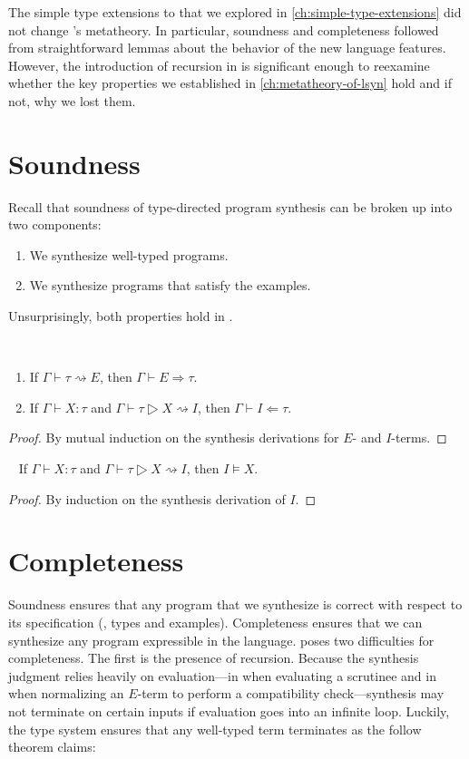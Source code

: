 The simple type extensions to \lsyn{} that we explored in \autoref{ch:simple-type-extensions} did not change \lsyn{}'s metatheory.
In particular, soundness and completeness followed from straightforward lemmas about the behavior of the new language features.
However, the introduction of recursion in \mlsyn{} is significant enough to reexamine whether the key properties we established in \autoref{ch:metatheory-of-lsyn} hold and if not, why we lost them.

\section{Soundness}

Recall that soundness of type-directed program synthesis can be broken up into two components:
\begin{enumerate}
  \item We synthesize well-typed programs.
  \item We synthesize programs that satisfy the examples.
\end{enumerate}
Unsurprisingly, both properties hold in \mlsyn{}.

\begin{lemma}\ %
  \begin{enumerate}
    \item If $Γ ⊢ τ ⇝ E$, then $Γ ⊢ E ⇒ τ$.
    \item If $Γ ⊢ Χ : τ$ and $Γ ⊢ τ ▷ Χ ⇝ I$, then $Γ ⊢ I ⇐ τ$.
  \end{enumerate}
\end{lemma}
\begin{proof}
  By mutual induction on the synthesis derivations for $E$- and $I$-terms.
\end{proof}

\begin{lemma}\ %
  If $Γ ⊢ Χ : τ$ and $Γ ⊢ τ ▷ Χ ⇝ I$, then $I ⊨ Χ$.
\end{lemma}
\begin{proof}
  By induction on the synthesis derivation of $I$.
\end{proof}

\section{Completeness}

Soundness ensures that any program that we synthesize is correct with respect to its specification (\ie, types and examples).
Completeness ensures that we can synthesize any program expressible in the language.
\mlsyn{} poses two difficulties for completeness.
The first is the presence of recursion.
Because the synthesis judgment relies heavily on evaluation---in  when evaluating a scrutinee and in  when normalizing an $E$-term to perform a compatibility check---synthesis may not terminate on certain inputs if evaluation goes into an infinite loop.
Luckily, the \mlsyn{} type system ensures that any well-typed term terminates as the follow theorem claims:

